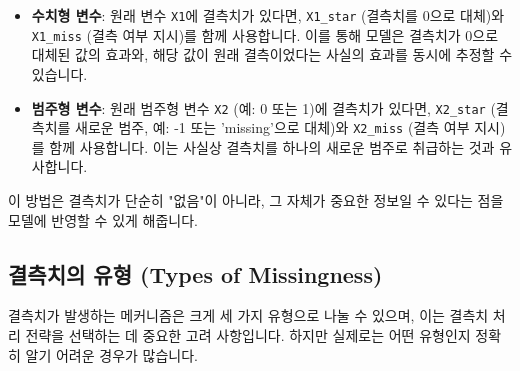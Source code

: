 \documentclass[11pt,a4paper]{article}
\theoremstyle{definition}
\begin{document}
\begin{examplebox}[title=결측 지시 변수 활용 예시]
\begin{itemize}
    \item \textbf{수치형 변수}: 원래 변수 \texttt{X1}에 결측치가 있다면, \texttt{X1_star} (결측치를 0으로 대체)와 \texttt{X1_miss} (결측 여부 지시)를 함께 사용합니다. 이를 통해 모델은 결측치가 0으로 대체된 값의 효과와, 해당 값이 원래 결측이었다는 사실의 효과를 동시에 추정할 수 있습니다.
    \item \textbf{범주형 변수}: 원래 범주형 변수 \texttt{X2} (예: 0 또는 1)에 결측치가 있다면, \texttt{X2_star} (결측치를 새로운 범주, 예: -1 또는 'missing'으로 대체)와 \texttt{X2_miss} (결측 여부 지시)를 함께 사용합니다. 이는 사실상 결측치를 하나의 새로운 범주로 취급하는 것과 유사합니다.
\end{itemize}
이 방법은 결측치가 단순히 "없음"이 아니라, 그 자체가 중요한 정보일 수 있다는 점을 모델에 반영할 수 있게 해줍니다.
\end{examplebox}

\subsection*{결측치의 유형 (Types of Missingness)}
결측치가 발생하는 메커니즘은 크게 세 가지 유형으로 나눌 수 있으며, 이는 결측치 처리 전략을 선택하는 데 중요한 고려 사항입니다. 하지만 실제로는 어떤 유형인지 정확히 알기 어려운 경우가 많습니다.
\end{document}
